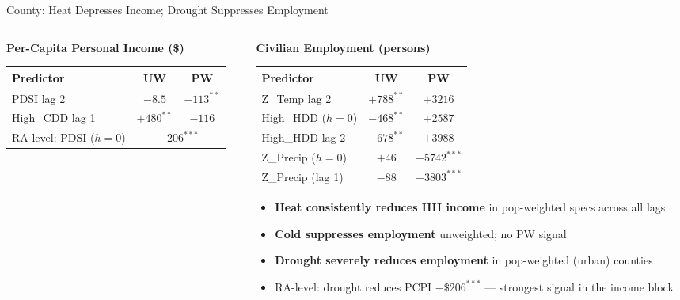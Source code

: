 \documentclass[aspectratio=169,11pt]{beamer}
\newcommand{\emphcolor}[1]{{\color{WarmOrange}\textbf{#1}}}
\newcommand{\tealtext}[1]{{\color{Teal}#1}}
\begin{document}
\begin{frame}{County: Heat Depresses Income; Drought Suppresses Employment}
\begin{columns}[T]
\begin{column}{0.47\textwidth}
      \tealtext{\textbf{Per-Capita Personal Income (\$)}}\\[0.25em]
      \begin{tabular}{lcc}
        \toprule
        Predictor & UW & PW \\
        \midrule
        PDSI lag 2             & $-8.5$  & \emphcolor{$-113^{**}$} \\
        High\_CDD lag 1        & \emphcolor{$+480^{**}$} & $-116$ \\
        RA-level: PDSI ($h{=}0$) & \multicolumn{2}{c}{\emphcolor{$-206^{***}$}} \\
        \bottomrule
      \end{tabular}
    \end{column}
    \begin{column}{0.47\textwidth}
      \tealtext{\textbf{Civilian Employment (persons)}}\\[0.25em]
      \begin{tabular}{lcc}
        \toprule
        Predictor & UW & PW \\
        \midrule
        Z\_Temp lag 2       & \emphcolor{$+788^{**}$} & $+3216$ \\
        High\_HDD ($h{=}0$) & \emphcolor{$-468^{**}$} & $+2587$ \\
        High\_HDD lag 2     & \emphcolor{$-678^{**}$} & $+3988$ \\
        Z\_Precip ($h{=}0$) & $+46$   & \emphcolor{$-5742^{***}$} \\
        Z\_Precip (lag 1)   & $-88$   & \emphcolor{$-3803^{***}$} \\
        \bottomrule
      \end{tabular}
      \vspace{0.3em}
      \begin{itemize}\itemsep0.2em
        \item \emphcolor{Heat consistently reduces HH income} in pop-weighted specs across all lags
        \item \emphcolor{Cold suppresses employment} unweighted; no PW signal
        \item \emphcolor{Drought severely reduces employment} in pop-weighted (urban) counties
        \item RA-level: drought reduces PCPI $-\$206^{***}$ — strongest signal in the income block
      \end{itemize}
    \end{column}
  \end{columns}
\end{frame}
\end{document}

